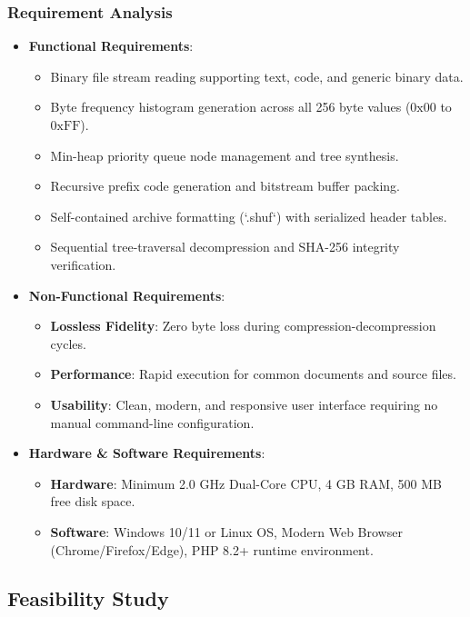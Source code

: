 \documentclass[12pt,a4paper]{article}
\begin{document}
\subsubsection{Requirement Analysis}
\begin{itemize}
    \item \textbf{Functional Requirements}:
    \begin{itemize}
        \item Binary file stream reading supporting text, code, and generic binary data.
        \item Byte frequency histogram generation across all 256 byte values ($0\text{x}00$ to $0\text{xFF}$).
        \item Min-heap priority queue node management and tree synthesis.
        \item Recursive prefix code generation and bitstream buffer packing.
        \item Self-contained archive formatting (`.shuf`) with serialized header tables.
        \item Sequential tree-traversal decompression and SHA-256 integrity verification.
    \end{itemize}
    \item \textbf{Non-Functional Requirements}:
    \begin{itemize}
        \item \textbf{Lossless Fidelity}: Zero byte loss during compression-decompression cycles.
        \item \textbf{Performance}: Rapid execution for common documents and source files.
        \item \textbf{Usability}: Clean, modern, and responsive user interface requiring no manual command-line configuration.
    \end{itemize}
    \item \textbf{Hardware \& Software Requirements}:
    \begin{itemize}
        \item \textbf{Hardware}: Minimum 2.0 GHz Dual-Core CPU, 4 GB RAM, 500 MB free disk space.
        \item \textbf{Software}: Windows 10/11 or Linux OS, Modern Web Browser (Chrome/Firefox/Edge), PHP 8.2+ runtime environment.
    \end{itemize}
\end{itemize}

\subsection{Feasibility Study}
\end{document}
